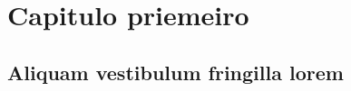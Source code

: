 \chapter{Capitulo priemeiro}

\section{Aliquam vestibulum fringilla lorem}

\lipsum[1]

\lipsum[2-3]
